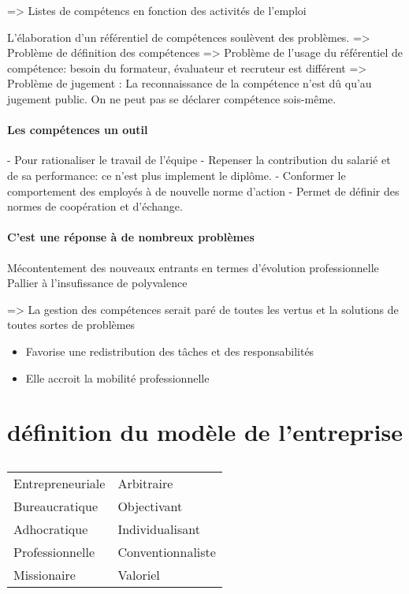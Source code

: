 => Listes de compétencs en fonction des activités de l'emploi

L'élaboration d'un référentiel de compétences soulèvent des problèmes. 
=> Problème de définition des compétences 
=> Problème de l'usage du référentiel de compétence: besoin du formateur, évaluateur et recruteur est différent
=> Problème de jugement : La reconnaissance de la compétence n'est dû qu'au jugement public. On ne peut pas se déclarer compétence sois-même. 



\paragraph{Les compétences un outil}
- Pour rationaliser le travail de l'équipe
- Repenser la contribution du salarié et de sa performance: ce n'est plus implement le diplôme. 
- Conformer le comportement des employés à de nouvelle norme d'action 
- Permet de définir des normes de coopération et d'échange. 

\paragraph{C'est une réponse à de nombreux problèmes}
Mécontentement des nouveaux entrants en termes d'évolution professionnelle
Pallier à l'insufissance de polyvalence

=> La gestion des compétences serait paré de toutes les vertus et la solutions de toutes sortes de problèmes

\begin{itemize}
    \item Favorise une redistribution des tâches et des responsabilités
    \item Elle accroit la mobilité professionnelle
\end{itemize}



\section{définition du modèle de l'entreprise}
\begin{table}
    \caption{}
    \label{tab: page 185}

    \begin{center}
        \begin{tabular}{ll}
             Entrepreneuriale & Arbitraire\\
             Bureaucratique & Objectivant \\
             Adhocratique & Individualisant\\
             Professionnelle & Conventionnaliste \\
             Missionaire & Valoriel \\
        \end{tabular}
    \end{center}
\end{table}



